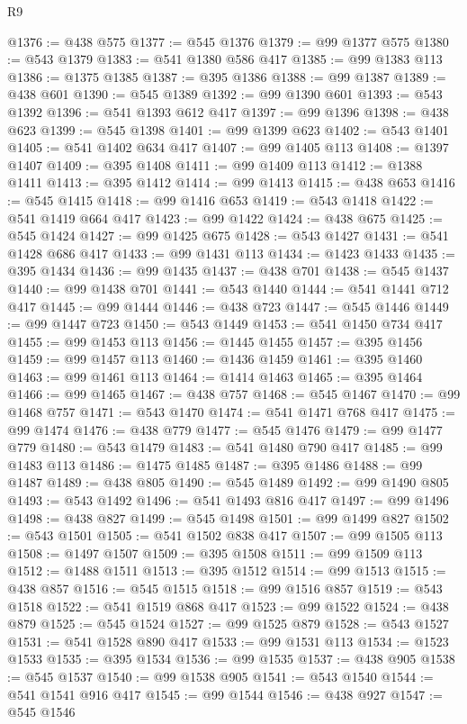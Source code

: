 \begin{lexlean}{R9}
\begin{coremodule}
@1376 := @438 @575
@1377 := @545 @1376
@1379 := @99 @1377 @575
@1380 := @543 @1379
@1383 := @541 @1380 @586 @417
@1385 := @99 @1383 @113
@1386 := @1375 @1385
@1387 := @395 @1386
@1388 := @99 @1387
@1389 := @438 @601
@1390 := @545 @1389
@1392 := @99 @1390 @601
@1393 := @543 @1392
@1396 := @541 @1393 @612 @417
@1397 := @99 @1396
@1398 := @438 @623
@1399 := @545 @1398
@1401 := @99 @1399 @623
@1402 := @543 @1401
@1405 := @541 @1402 @634 @417
@1407 := @99 @1405 @113
@1408 := @1397 @1407
@1409 := @395 @1408
@1411 := @99 @1409 @113
@1412 := @1388 @1411
@1413 := @395 @1412
@1414 := @99 @1413
@1415 := @438 @653
@1416 := @545 @1415
@1418 := @99 @1416 @653
@1419 := @543 @1418
@1422 := @541 @1419 @664 @417
@1423 := @99 @1422
@1424 := @438 @675
@1425 := @545 @1424
@1427 := @99 @1425 @675
@1428 := @543 @1427
@1431 := @541 @1428 @686 @417
@1433 := @99 @1431 @113
@1434 := @1423 @1433
@1435 := @395 @1434
@1436 := @99 @1435
@1437 := @438 @701
@1438 := @545 @1437
@1440 := @99 @1438 @701
@1441 := @543 @1440
@1444 := @541 @1441 @712 @417
@1445 := @99 @1444
@1446 := @438 @723
@1447 := @545 @1446
@1449 := @99 @1447 @723
@1450 := @543 @1449
@1453 := @541 @1450 @734 @417
@1455 := @99 @1453 @113
@1456 := @1445 @1455
@1457 := @395 @1456
@1459 := @99 @1457 @113
@1460 := @1436 @1459
@1461 := @395 @1460
@1463 := @99 @1461 @113
@1464 := @1414 @1463
@1465 := @395 @1464
@1466 := @99 @1465
@1467 := @438 @757
@1468 := @545 @1467
@1470 := @99 @1468 @757
@1471 := @543 @1470
@1474 := @541 @1471 @768 @417
@1475 := @99 @1474
@1476 := @438 @779
@1477 := @545 @1476
@1479 := @99 @1477 @779
@1480 := @543 @1479
@1483 := @541 @1480 @790 @417
@1485 := @99 @1483 @113
@1486 := @1475 @1485
@1487 := @395 @1486
@1488 := @99 @1487
@1489 := @438 @805
@1490 := @545 @1489
@1492 := @99 @1490 @805
@1493 := @543 @1492
@1496 := @541 @1493 @816 @417
@1497 := @99 @1496
@1498 := @438 @827
@1499 := @545 @1498
@1501 := @99 @1499 @827
@1502 := @543 @1501
@1505 := @541 @1502 @838 @417
@1507 := @99 @1505 @113
@1508 := @1497 @1507
@1509 := @395 @1508
@1511 := @99 @1509 @113
@1512 := @1488 @1511
@1513 := @395 @1512
@1514 := @99 @1513
@1515 := @438 @857
@1516 := @545 @1515
@1518 := @99 @1516 @857
@1519 := @543 @1518
@1522 := @541 @1519 @868 @417
@1523 := @99 @1522
@1524 := @438 @879
@1525 := @545 @1524
@1527 := @99 @1525 @879
@1528 := @543 @1527
@1531 := @541 @1528 @890 @417
@1533 := @99 @1531 @113
@1534 := @1523 @1533
@1535 := @395 @1534
@1536 := @99 @1535
@1537 := @438 @905
@1538 := @545 @1537
@1540 := @99 @1538 @905
@1541 := @543 @1540
@1544 := @541 @1541 @916 @417
@1545 := @99 @1544
@1546 := @438 @927
@1547 := @545 @1546

\end{coremodule}
\end{lexlean}
